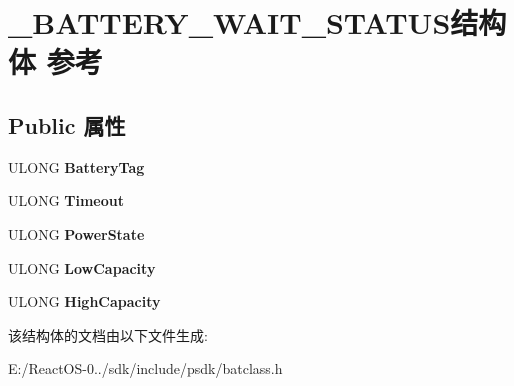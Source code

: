 \hypertarget{struct___b_a_t_t_e_r_y___w_a_i_t___s_t_a_t_u_s}{}\section{\+\_\+\+B\+A\+T\+T\+E\+R\+Y\+\_\+\+W\+A\+I\+T\+\_\+\+S\+T\+A\+T\+U\+S结构体 参考}
\label{struct___b_a_t_t_e_r_y___w_a_i_t___s_t_a_t_u_s}
\subsection*{Public 属性}
\begin{DoxyCompactItemize}
\item 
\mbox{\label{struct___b_a_t_t_e_r_y___w_a_i_t___s_t_a_t_u_s_a20b142f3d9b15d37f24b8d86fe8f4dec}} 
U\+L\+O\+NG {\bfseries Battery\+Tag}
\item 
\mbox{\label{struct___b_a_t_t_e_r_y___w_a_i_t___s_t_a_t_u_s_a98cc1a27daa32c9814dfeb1345c1dc62}} 
U\+L\+O\+NG {\bfseries Timeout}
\item 
\mbox{\label{struct___b_a_t_t_e_r_y___w_a_i_t___s_t_a_t_u_s_a1e1e970624a7c1db189e275c70a1d8af}} 
U\+L\+O\+NG {\bfseries Power\+State}
\item 
\mbox{\label{struct___b_a_t_t_e_r_y___w_a_i_t___s_t_a_t_u_s_a57c4f195f03d56aa7e5b30a776857c21}} 
U\+L\+O\+NG {\bfseries Low\+Capacity}
\item 
\mbox{\label{struct___b_a_t_t_e_r_y___w_a_i_t___s_t_a_t_u_s_ab572f36742397611c5c3b3fca7ff098b}} 
U\+L\+O\+NG {\bfseries High\+Capacity}
\end{DoxyCompactItemize}


该结构体的文档由以下文件生成\+:\begin{DoxyCompactItemize}
\item 
E\+:/\+React\+O\+S-\/0../sdk/include/psdk/batclass.\+h\end{DoxyCompactItemize}
